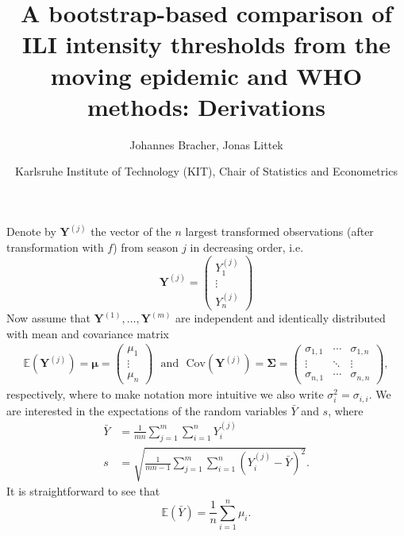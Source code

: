 \documentclass{article}
\newcommand{\sd}{s}
\newcommand{\mean}{\bar{Y}}
\begin{document}

\title{A bootstrap-based comparison of ILI intensity thresholds from the moving epidemic and WHO methods: Derivations}
\author{Johannes Bracher, Jonas Littek}
\date{ \small
Karlsruhe Institute of Technology (KIT), Chair of Statistics and Econometrics}

\maketitle

Denote by $\mathbf{Y}^{(j)}$ the vector of the $n$ largest transformed observations (after transformation with $f$) from season $j$ in decreasing order, i.e.
$$
\mathbf{Y}^{(j)} = \left(
\begin{array}{c}
Y^{(j)}_1\\
\vdots\\
Y^{(j)}_n
\end{array}
\right)
$$
Now assume that $\mathbf{Y}^{(1)}, \dots, \mathbf{Y}^{(m)}$ are independent and identically distributed with mean and covariance matrix
\begin{align}
\mathbb{E}(\mathbf{Y}^{(j)}) = \boldsymbol{\mu} = \left(\begin{array}{c}
\mu_1\\
\vdots\\
\mu_n
\end{array}\right) \ \ \ \text{and} \ \ \ \text{Cov}(\mathbf{Y}^{(j)}) = \boldsymbol{\Sigma} =
\left(\begin{array}{ccc}
\sigma_{1, 1} & \cdots & \sigma_{1, n}\\
\vdots & \ddots &\vdots\\
\sigma_{n, 1} & \cdots & \sigma_{n, n}
\end{array}\right),
\end{align}
respectively, where to make notation more intuitive we also write $\sigma^2_i = \sigma_{i, i}$. We are interested in the expectations of the random variables $\mean$ and $\sd$, where
\begin{align*}
\mean & = \frac{1}{mn} \sum_{j = 1}^m \sum_{i = 1}^n Y_i^{(j)}\\
\sd & = \sqrt{\frac{1}{mn - 1} \sum_{j = 1}^m \sum_{i = 1}^n \left(Y_i^{(j)} - \mean\right)^2}.
\end{align*}
It is straightforward to see that 
\begin{equation}
\mathbb{E}(\mean) = \frac{1}{n} \sum_{i = 1}^n \mu_i.
\label{eq:expectation_mu}
\end{equation}
\end{document}

